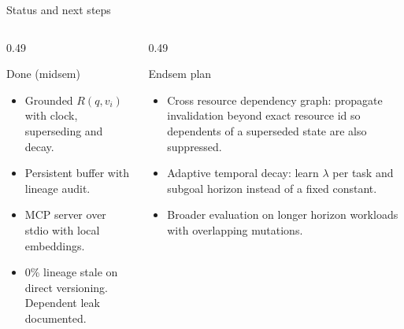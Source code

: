 \documentclass[aspectratio=169,10pt]{beamer}
\begin{document}
\begin{frame}{Status and next steps}
  \begin{columns}[T,onlytextwidth]
    \begin{column}{0.49\textwidth}
      \begin{block}{Done (midsem)}
        \begin{itemize}
          \item Grounded $R(q,v_i)$ with clock, superseding and decay.
          \item Persistent buffer with lineage audit.
          \item MCP server over stdio with local embeddings.
          \item 0\% lineage stale on direct versioning. Dependent leak documented.
        \end{itemize}
      \end{block}
    \end{column}
    \begin{column}{0.49\textwidth}
      \begin{block}{Endsem plan}
        \begin{itemize}
          \item Cross resource dependency graph: propagate invalidation beyond exact resource id so dependents of a superseded state are also suppressed.
          \item Adaptive temporal decay: learn $\lambda$ per task and subgoal horizon instead of a fixed constant.
          \item Broader evaluation on longer horizon workloads with overlapping mutations.
        \end{itemize}
      \end{block}
    \end{column}
  \end{columns}
\end{frame}

\end{document}
